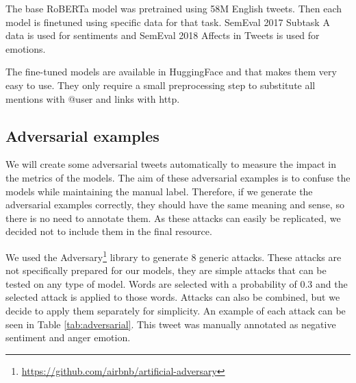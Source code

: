 \documentclass[11pt,a4paper]{article}
\begin{document}
The base RoBERTa \cite{liu2019roberta} model was pretrained using 58M English tweets. Then each model is finetuned using specific data for that task. SemEval 2017 Subtask A data \cite{rosenthal2019semeval} is used for sentiments and SemEval 2018 Affects in Tweets \cite{mohammad-etal-2018-semeval} is used for emotions.

The fine-tuned models are available in HuggingFace and that makes them very easy to use. They only require a small preprocessing step to substitute all mentions with @user and links with http.

\subsection{Adversarial examples}

We will create some adversarial tweets automatically to measure the impact in the metrics of the models. The aim of these adversarial examples is to confuse the models while maintaining the manual label. Therefore, if we generate the adversarial examples correctly, they should have the same meaning and sense, so there is no need to annotate them. As these attacks can easily be replicated, we decided not to include them in the final resource.

We used the Adversary\footnote{\url{https://github.com/airbnb/artificial-adversary}} library to generate 8 generic attacks. These attacks are not specifically prepared for our models, they are simple attacks that can be tested on any type of model. Words are selected with a probability of 0.3 and the selected attack is applied to those words. Attacks can also be combined, but we decide to apply them separately for simplicity. An example of each attack can be seen in Table \ref{tab:adversarial}. This tweet was manually annotated as negative sentiment and anger emotion.
\end{document}
